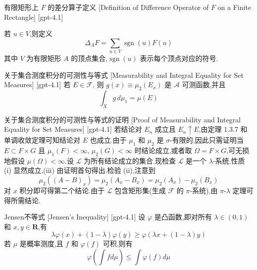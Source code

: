 \documentclass[UTF8]{ctexart}
\begin{document}
    
    
    \begin{dfn}
        {有限矩形上 $F$ 的差分算子定义}
        [Definition of Difference Operator of $F$ on a Finite Rectangle]
        [gpt-4.1]
        
若 $
u \in V$,则定义
\[
\Delta_{A} F = \sum_{
u \in V}\operatorname{sgn}(
u) F(
u)
\]
其中 $V$ 为有限矩形 $A$ 的顶点集合,$\operatorname{sgn}(
u)$ 表示每个顶点对应的符号.

    \end{dfn}
    
    
    
    \begin{lma}
        {关于集合测度积分的可测性与等式}
        [Measurability and Integral Equality for Set Measures]
        [gpt-4.1]
        若 $E \in \mathcal{F}$, 则 $g(x) \equiv \mu_{2}(E_{x})$ 是 $\mathcal{A}$ 可测函数,并且
\[
\int_{X} g\, d\mu_{1} = \mu(E)
\]

    \end{lma}
    
    
    
    \begin{prf}
        {关于集合测度积分的可测性与等式的证明}
        [Proof of Measurability and Integral Equality for Set Measures]
        [gpt-4.1]
        若结论对 $E_n$ 成立且 $E_n \uparrow E$,由定理 1.3.7 和单调收敛定理可知结论对 $E$ 也成立.由于 $\mu_1$ 和 $\mu_2$ 是 $\sigma$-有限的,因此只需证明当 $E \subset F \times G$ 且 $\mu_1(F) < \infty$, $\mu_2(G) < \infty$ 时结论成立,或者取 $\Omega = F \times G$,可无损地假设 $\mu(\Omega) < \infty$.设 $\mathcal{L}$ 为所有结论成立的集合.现检查 $\mathcal{L}$ 是一个 $\lambda$-系统.性质 (i) 显然成立,(iii) 由证明首句得出.检验 (ii),注意到
\[
\mu_2((A-B)_x) = \mu_2(A_x - B_x) = \mu_2(A_x) - \mu_2(B_x)
\]
对 $x$ 积分即可得第二个结论.由于 $\mathcal{L}$ 包含矩形集(生成 $\mathcal{F}$ 的 $\pi$-系统),由 $\pi$-$\lambda$ 定理可得所需结论.

    \end{prf}
    
    
    
    \begin{thm}
        {Jensen不等式}
        [Jensen's Inequality]
        [gpt-4.1]
        设 $\varphi$ 是凸函数,即对所有 $\lambda \in (0,1)$ 和 $x, y \in \mathbf{R}$,有
\[
\lambda \varphi(x) + (1-\lambda)\varphi(y) \geq \varphi(\lambda x + (1-\lambda)y)
\]
若 $\mu$ 是概率测度,且 $f$ 和 $\varphi(f)$ 可积,则有
\[
\varphi\left( \int f d\mu \right) \leq \int \varphi(f) d\mu
\]

    \end{thm}
    
\end{document}

